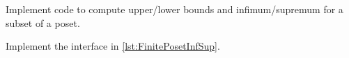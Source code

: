
\begin{codeexercise}
    Implement code to compute upper/lower bounds and infimum/supremum for a subset of a poset.

    Implement the interface in \cref{lst:FinitePosetInfSup}.
\end{codeexercise}

